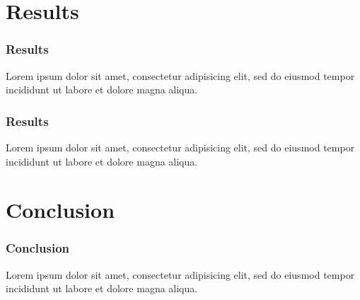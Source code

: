 \documentclass[xcolor=dvipsnames,10pt]{beamer}
\newcommand{\RE}{Results}
\newcommand{\CO}{Conclusion}
\begin{document}
  \section{\RE}
  \begin{frame}
    \frametitle{\RE}
    Lorem ipsum dolor sit amet, consectetur adipisicing elit, sed do eiusmod tempor incididunt ut labore et dolore magna aliqua.
  \end{frame}

  \begin{frame}
    \frametitle{\RE}
    Lorem ipsum dolor sit amet, consectetur adipisicing elit, sed do eiusmod tempor incididunt ut labore et dolore magna aliqua.
  \end{frame}

  \section{\CO}
  \begin{frame}
    \frametitle{\CO}
    Lorem ipsum dolor sit amet, consectetur adipisicing elit, sed do eiusmod tempor incididunt ut labore et dolore magna aliqua.
  \end{frame}


%
%
\end{document}
